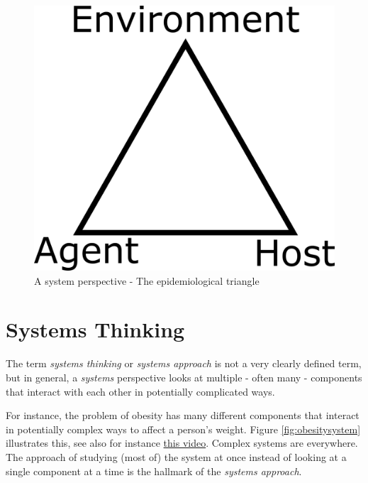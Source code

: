 \documentclass[]{book}
\theoremstyle{definition}
\theoremstyle{definition}
\theoremstyle{definition}
\theoremstyle{remark}
\begin{document}
\begin{figure}
\centering
\includegraphics{./images/epi-triangle.png}
\caption{\label{fig:epitriangle}A system perspective - The epidemiological
triangle}
\end{figure}

\section{Systems Thinking}\label{systems-thinking}

The term \emph{systems thinking} or \emph{systems approach} is not a
very clearly defined term, but in general, a \emph{systems} perspective
looks at multiple - often many - components that interact with each
other in potentially complicated ways.

For instance, the problem of obesity has many different components that
interact in potentially complex ways to affect a person's weight. Figure
\ref{fig:obesitysystem} illustrates this, see also for instance
\href{https://youtu.be/2vojPksdbtI}{this video}. Complex systems are
everywhere. The approach of studying (most of) the system at once
instead of looking at a single component at a time is the hallmark of
the \emph{systems approach}.
\end{document}
